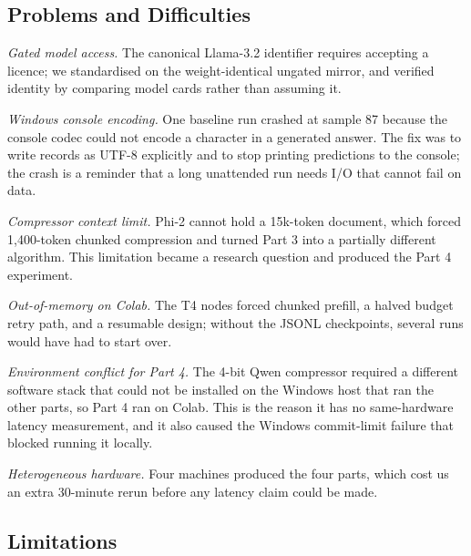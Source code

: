 \documentclass[10pt,a4paper,twocolumn]{article}
\begin{document}
\subsection{Problems and Difficulties}

\emph{Gated model access.} The canonical Llama-3.2 identifier requires accepting a
licence; we standardised on the weight-identical ungated mirror, and verified
identity by comparing model cards rather than assuming it.

\emph{Windows console encoding.} One baseline run crashed at sample 87 because the
console codec could not encode a character in a generated answer. The fix was to
write records as UTF-8 explicitly and to stop printing predictions to the console;
the crash is a reminder that a long unattended run needs I/O that cannot fail on
data.

\emph{Compressor context limit.} Phi-2 cannot hold a 15k-token document, which
forced 1{,}400-token chunked compression and turned Part 3 into a partially
different algorithm. This limitation became a research question and produced the
Part 4 experiment.

\emph{Out-of-memory on Colab.} The T4 nodes forced chunked prefill, a halved budget
retry path, and a resumable design; without the JSONL checkpoints, several runs
would have had to start over.

\emph{Environment conflict for Part 4.} The 4-bit Qwen compressor required a
different software stack that could not be installed on the Windows host that ran
the other parts, so Part 4 ran on Colab. This is the reason it has no
same-hardware latency measurement, and it also caused the Windows
commit-limit failure that blocked running it locally.

\emph{Heterogeneous hardware.} Four machines produced the four parts, which cost us
an extra 30-minute rerun before any latency claim could be made.

\subsection{Limitations}
\end{document}
